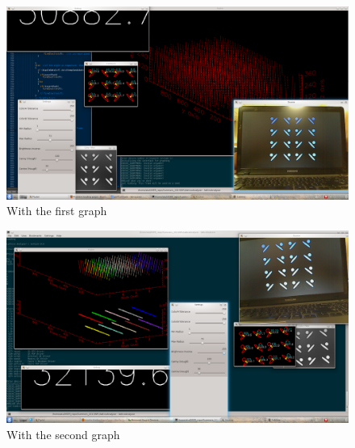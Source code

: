 			\begin{figure}[bth]
				\begin{center}
					\includegraphics[width=1.1\linewidth]{../../latticeAnalyser/snapshot8.png}
				\end{center}
			\caption[With the first graph]{With the first graph}
			\label{snapshot8}
			\end{figure}

			\begin{figure}[bth]
				\begin{center}
					\includegraphics[width=1.1\linewidth]{../../latticeAnalyser/snapshot9.png}
				\end{center}
			\caption[With the second graph]{With the second graph}
			\label{snapshot9}
			\end{figure}

